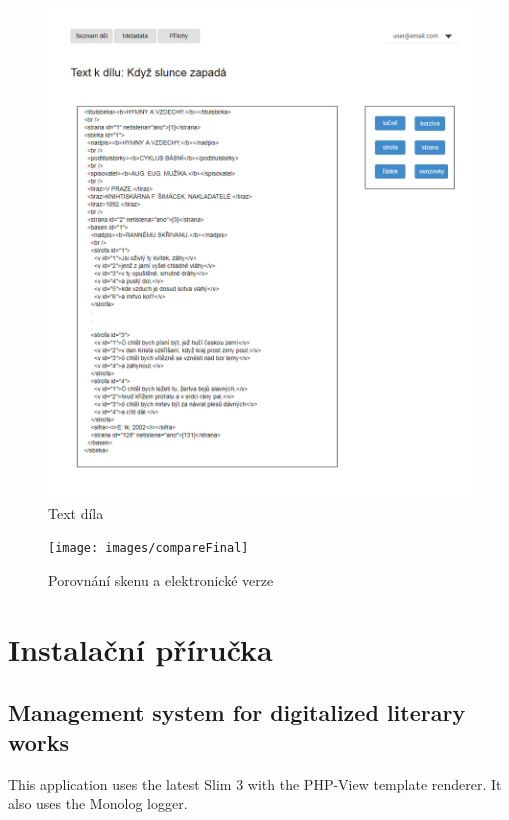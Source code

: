 \documentclass[thesis=B,czech]{FITthesis}[2012/06/26]
\begin{document}
    \begin {figure}[H]\centering
        \includegraphics[width=\textwidth]{images/text}
        \caption {Text díla}
        \label {fig:text}
    \end{figure}
    
    \begin {figure}[H]\centering
        \texttt{[image: images/compareFinal]}
        \caption {Porovnání skenu a elektronické verze}
        \label {fig:scan}
    \end{figure}

\chapter{Instalační příručka} \label{installApp}

    \section{Management system for digitalized literary works}
        This application uses the latest Slim 3 with the PHP-View template renderer. It also uses the Monolog logger.
\end{document}
